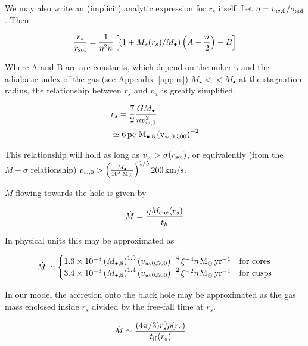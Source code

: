 \documentclass[usenatbib,fleqn]{mn2e}
\newcommand{\Mdot}{\dot{M}}
\newcommand{\rs}{r_s}
\newcommand{\vw}{v_w}
\newcommand{\pc}{\rm pc}
\newcommand{\Menc}{M_{\rm enc}}
\newcommand{\Mstar}{M_{\star}}
\newcommand{\Mbh}[1][]{M_{\bullet#1}}
\newcommand{\Mbheight}{M_{\bullet,8}}
\newcommand{\soi}{\rm soi}
\newcommand{\rsoi}{r_{\soi}}
\newcommand{\ff}{\rm ff}
\newcommand{\vwO}{v_{w,0}}
\newcommand{\x}{\frac{r_s}{\rsoi}}
\newcommand{\vwOFH}{v_{w,0,500}}
\newcommand{\pyear}{{\rm yr}^{-1}}
\renewcommand{\th}{t_h}
\begin{document}
We may also write an (implicit) analytic expression for $\rs$
itself. Let  $\eta=v_{w,0}/\sigma_{\rm soi}$. Then 


\begin{align}
  \x=\frac{1}{\eta^2 n}\left[ (1+\Mstar(\rs)/\Mbh)\left(A-\frac{n}{2}\right)-B\right]
  \label{eq:stag_analytic}
\end{align}

Where A and B are are constants, which depend on the nuker $\gamma$
and the adiabatic index of the gas (see Appendix~\ref{app:rs})  $\Mstar << \Mbh$ at the stagnation radius, the relationship between $\rs$ and $\vw$ is greatly simplified. 

\begin{align}
  &\rs=\frac{7}{2}\frac{G \Mbh}{n \vwO^2}\\
  &\simeq 6 \, \pc \,\, \Mbheight \left(\vwOFH\right)^{-2}
  \label{eq:stag_simple}
\end{align}

This relationship will hold as long as $\vw > \sigma(\rsoi)$, or equivalently (from the $M-\sigma$ relationship) $\vwO > \left(\frac{\Mbh}{10^8 \Msun}\right)^{1/5} 200 {\rm \, km/s}$.

$\Mdot$ flowing towards the hole is given by

\begin{align}
  \dot{M}=\frac{\eta \Menc(\rs)}{\th}
\end{align}

In physical units this may be approximated as 

\begin{align}
  \dot{M}\simeq
  \begin{cases}
    1.6 \times 10^{-3}  \left(\Mbheight\right)^{1.9}
    \left(\vwOFH\right)^{-4} \xi^{-4} \eta \Msun \, \pyear& \text{for cores} \\
    3.4 \times 10^{-3} \left(\Mbheight\right)^{1.4}
    \left(\vwOFH\right)^{-2} \xi^{-2} \eta \Msun \, \pyear  & \text{for cusps} 
  \end{cases}
  \label{eq:mdot_analytic}
\end{align}

In our model the accretion onto the black hole may be approximated as
the gas mass enclosed inside $\rs$ divided by the free-fall time at $\rs$.

\begin{align}
  &\dot{M}\simeq\frac{(4 \pi/3) \rs^3 \rho(\rs)}{t_{\ff}(\rs)}
  \label{eq:mdot_gas}
\end{align}
\end{document}
